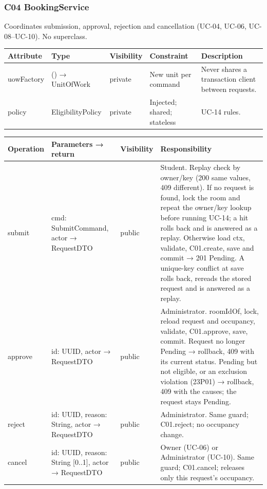 \subsubsection{C04 BookingService}

Coordinates submission, approval, rejection and cancellation (UC-04, UC-06, UC-08–UC-10). No superclass.\par

\small
\setlength{\tabcolsep}{3pt}
\renewcommand{\arraystretch}{1.12}
\begin{longtable}{|p{}|p{}|p{}|p{}|p{}|}
\hline
\textbf{Attribute} & \textbf{Type} & \textbf{Visibility} & \textbf{Constraint} & \textbf{Description} \\ \hline
\endfirsthead \hline
uowFactory & () → UnitOfWork & private & New unit per command & Never shares a transaction client between requests. \\ \hline
policy & EligibilityPolicy & private & Injected; shared; stateless & UC-14 rules. \\ \hline
\end{longtable}
\normalsize

\small
\setlength{\tabcolsep}{3pt}
\renewcommand{\arraystretch}{1.12}
\begin{longtable}{|p{}|p{}|p{}|p{}|}
\hline
\textbf{Operation} & \textbf{Parameters → return} & \textbf{Visibility} & \textbf{Responsibility} \\ \hline
\endfirsthead \hline
submit & cmd: SubmitCommand, actor → RequestDTO & public & Student. Replay check by owner/key (200 same values, 409 different). If no request is found, lock the room and repeat the owner/key lookup before running UC-14; a hit rolls back and is answered as a replay. Otherwise load ctx, validate, C01.create, save and commit → 201 Pending. A unique-key conflict at save rolls back, rereads the stored request and is answered as a replay. \\ \hline
approve & id: UUID, actor → RequestDTO & public & Administrator. roomIdOf, lock, reload request and occupancy, validate, C01.approve, save, commit. Request no longer Pending → rollback, 409 with its current status. Pending but not eligible, or an exclusion violation (23P01) → rollback, 409 with the causes; the request stays Pending. \\ \hline
reject & id: UUID, reason: String, actor → RequestDTO & public & Administrator. Same guard; C01.reject; no occupancy change. \\ \hline
cancel & id: UUID, reason: String [0..1], actor → RequestDTO & public & Owner (UC-06) or Administrator (UC-10). Same guard; C01.cancel; releases only this request's occupancy. \\ \hline
\end{longtable}
\normalsize


